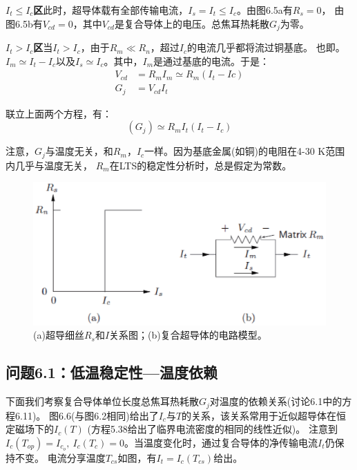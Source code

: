 \textbf{$I_t\le I_c$区}\quad 此时，超导体载有全部传输电流，$I_s=I_t\le I_c$。由图6.5a有$R_s=0$，
由图6.5b有$V_{cd}=0$，其中$V_{cd}$是复合导体上的电压。总焦耳热耗散$G_j$为零。

\textbf{$I_t>I_c$区}\quad 当$I_t>I_c$，由于$R_m\ll R_n$，超过$I_c$的电流几乎都将流过铜基底。
也即。$I_m\simeq I_t-I_c$以及$I_s\simeq I_c$。其中，$I_m$是通过基底的电流。于是：
\begin{subequations}
	\begin{align}
	V_{cd}&=R_mI_m\simeq R_m{(I_t-Ic)}\\
	G_{j}&=V_{cd}I_t
	\end{align}
\end{subequations}

联立上面两个方程，有：
\begin{equation}%
{(G_j)}\simeq R_{m}I_{t}{(I_t-I_c)}
\end{equation}

注意，$G_j$与温度无关，和$R_m，I_c$一样。因为基底金属(如铜)的电阻在4-30 K范围内几乎与温度无关，
$R_m$在LTS的稳定性分析时，总是假定为常数。
\begin{figure}[htbp]
	\centering
	\includegraphics[scale=0.7]{chpt6/figs/fig6.5.eps}
	\caption{(a)超导细丝$R_s$和$I$关系图；(b)复合超导体的电路模型。}
\end{figure}

\subsection{问题6.1：低温稳定性---温度依赖}
下面我们考察复合导体单位长度总焦耳热耗散$G_j$对温度的依赖关系(讨论6.1中的方程6.11)。
图6.6(与图6.2相同)给出了$I_c$与$T$的关系，该关系常用于近似超导体在恒定磁场下的$I_c(T)$
(方程5.38给出了临界电流密度的相同的线性近似)。
注意到$I_c(T_{op})=I_{c_o},\ I_c(T_c)=0$。当温度变化时，通过复合导体的净传输电流$I_t$仍保持不变。
电流分享温度$T_{cs}$如图，有$I_t=I_c(T_{cs})$给出。

